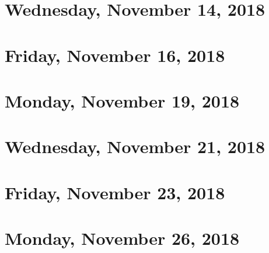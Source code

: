 \documentclass[reqno]{amsart}
\begin{document}
\section{Wednesday, November 14, 2018}
    
    
\section{Friday, November 16, 2018}
    

\section{Monday, November 19, 2018}
    
    
\section{Wednesday, November 21, 2018}
    

\section{Friday, November 23, 2018}
    
    
\section{Monday, November 26, 2018}
    
\end{document}
